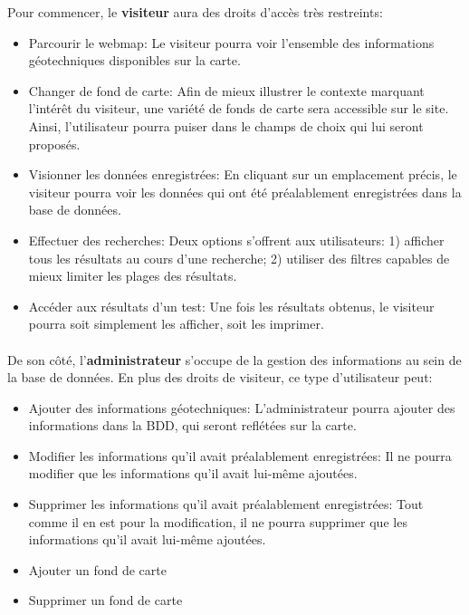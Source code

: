 Pour commencer, le \textbf{visiteur} aura des droits d'accès très restreints: \par 
\begin{itemize}
    \item Parcourir le webmap: Le visiteur pourra voir l'ensemble des informations 
    géotechniques disponibles sur la carte.
    \item Changer de fond de carte: Afin de mieux illustrer le contexte marquant 
    l'intérêt du visiteur, une variété de fonds de carte sera accessible sur le site. 
    Ainsi, l'utilisateur pourra puiser dans le champs de choix qui lui seront proposés.
    \item Visionner les données enregistrées: En cliquant sur un emplacement précis, 
    le visiteur pourra voir les données qui ont été préalablement enregistrées dans la base de données.
    \item Effectuer des recherches: Deux options s'offrent aux utilisateurs: 1) afficher tous les résultats au cours d'une recherche; 2) utiliser 
    des filtres capables de mieux limiter les plages des résultats.
    \item Accéder aux résultats d'un test: Une fois les résultats obtenus, le visiteur 
    pourra soit simplement les afficher, soit les imprimer.
\end{itemize}

\paragraph{}
De son côté, l'\textbf{administrateur} s'occupe de la gestion des informations au sein de la base 
de données. En plus des droits de visiteur, ce type d'utilisateur peut:
\begin{itemize}
    \item Ajouter des informations géotechniques: L'administrateur pourra ajouter des informations 
    dans la BDD, qui seront reflétées sur la carte. 
    \item Modifier les informations qu'il avait préalablement enregistrées: Il ne pourra 
    modifier que les informations qu'il avait lui-même ajoutées.
    \item Supprimer les informations qu'il avait préalablement enregistrées: Tout comme il 
    en est pour la modification, il ne pourra supprimer que les informations qu'il avait lui-même ajoutées.
    \item Ajouter un fond de carte
    \item Supprimer un fond de carte
\end{itemize}

